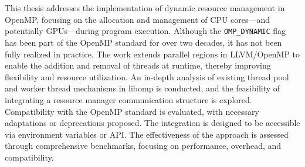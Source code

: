 \chapter{\abstractname}

This thesis addresses the implementation of dynamic resource management in OpenMP, focusing on the allocation and management of CPU cores---and potentially GPUs---during program execution. Although the \texttt{OMP\_DYNAMIC} flag has been part of the OpenMP standard for over two decades, it has not been fully realized in practice. The work extends parallel regions in LLVM/OpenMP to enable the addition and removal of threads at runtime, thereby improving flexibility and resource utilization. An in-depth analysis of existing thread pool and worker thread mechanisms in libomp is conducted, and the feasibility of integrating a resource manager communication structure is explored. Compatibility with the OpenMP standard is evaluated, with necessary adaptations or deprecations proposed. The integration is designed to be accessible via environment variables or API\@. The effectiveness of the approach is assessed through comprehensive benchmarks, focusing on performance, overhead, and compatibility.
